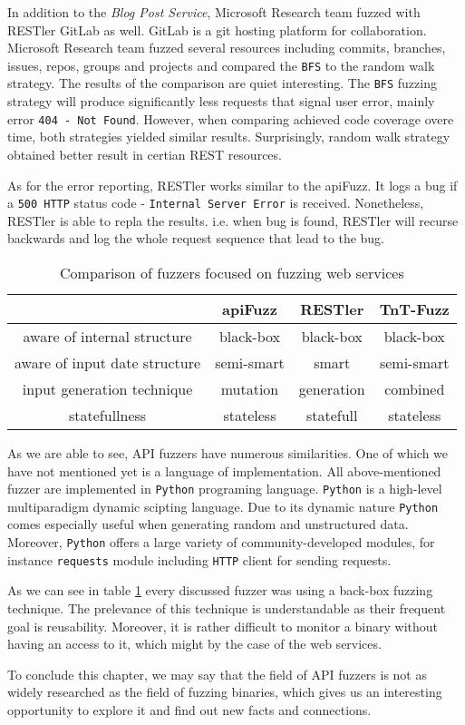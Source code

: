 In addition to the \textit{Blog Post Service}, Microsoft Research team fuzzed with RESTler GitLab as well. GitLab is a git hosting platform for collaboration. Microsoft Research team fuzzed several resources including commits, branches, issues, repos, groups and projects and compared the \texttt{BFS} to the random walk strategy. The results of the comparison are quiet interesting. The \texttt{BFS} fuzzing strategy will produce significantly less requests that signal user error, mainly error \texttt{404 - Not Found}. However, when comparing achieved code coverage overe time, both strategies yielded similar results. Surprisingly, random walk strategy obtained better result in certian REST resources.

As for the error reporting, RESTler works similar to the apiFuzz. It logs a bug if a \texttt{500 HTTP} status code - \texttt{Internal Server Error} is received. Nonetheless, RESTler is able to repla the results. i.e. when bug is found, RESTler will recurse backwards and log the whole request sequence that lead to the bug.

\begin{table}
\begin{center}
\begin{tabular}{|c|c c c|}
\hline
& apiFuzz  &  RESTler & TnT-Fuzz \\
\hline
aware of internal structure & black-box & black-box & black-box \\
aware of input date structure & semi-smart & smart & semi-smart \\
input generation technique & mutation & generation & combined\\
statefullness & stateless & statefull & stateless\\
\hline
\end{tabular}
\caption{Comparison of fuzzers focused on fuzzing web services}
\label{table:fuzzers-comparison}
\end{center}
\end{table}

As we are able to see, API fuzzers have numerous similarities. One of which we have not mentioned yet is a language of implementation. All above-mentioned fuzzer are implemented in \texttt{Python} programing language. \texttt{Python} is a high-level multiparadigm dynamic scipting language. Due to its dynamic nature \texttt{Python} comes especially useful when generating random and unstructured data. Moreover, \texttt{Python} offers a large variety of community-developed modules, for instance \texttt{requests} module including \texttt{HTTP} client for sending requests.

As we can see in table \ref{table:fuzzers-comparison} every discussed fuzzer was using a back-box fuzzing technique. The prelevance of this technique is understandable as their frequent goal is reusability. Moreover, it is rather difficult to monitor a binary without having an access to it, which might by the case of the web services.

To conclude this chapter, we may say that the field of API fuzzers is not as widely researched as the field of fuzzing binaries, which gives us an interesting opportunity to explore it and find out new facts and connections.
